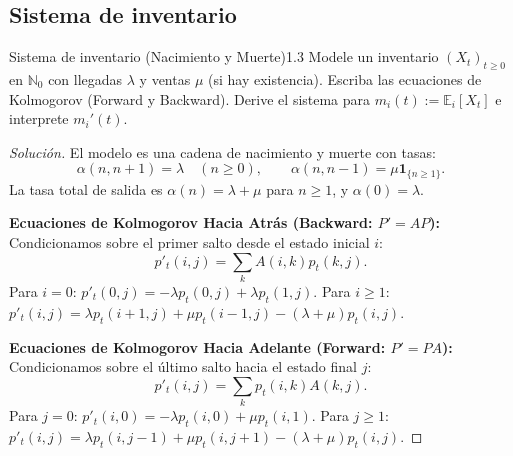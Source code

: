\documentclass[10pt,a4paper]{article}
\begin{document}
\newpage

\subsection{Sistema de inventario}

\begin{ejercicio}{Sistema de inventario (Nacimiento y Muerte)}{1.3}
    Modele un inventario $(X_t)_{t\ge 0}$ en $\mathbb{N}_0$ con llegadas $\lambda$ y ventas $\mu$ (si hay existencia). Escriba las ecuaciones de Kolmogorov (Forward y Backward). Derive el sistema para $m_i(t) := \mathbb{E}_i[X_t]$ e interprete $m_i'(t)$.
\end{ejercicio}


\begin{proof}[Solución]
    El modelo es una cadena de nacimiento y muerte con tasas:
    \[ \alpha(n, n+1) = \lambda \quad (n \ge 0), \qquad \alpha(n, n-1) = \mu \mathbf{1}_{\{n\ge 1\}}. \]
    La tasa total de salida es $\alpha(n) = \lambda + \mu$ para $n \ge 1$, y $\alpha(0) = \lambda$.


    \textbf{Ecuaciones de Kolmogorov Hacia Atrás (Backward: $P' = AP$):}
    Condicionamos sobre el primer salto desde el estado inicial $i$:
    \[ p'_t(i,j) = \sum_{k} A(i,k)p_t(k,j). \]
    Para $i = 0$: $p'_t(0,j) = -\lambda p_t(0,j) + \lambda p_t(1,j)$.
    Para $i \ge 1$: $p'_t(i,j) = \lambda p_t(i+1, j) + \mu p_t(i-1, j) - (\lambda + \mu) p_t(i,j)$.

    \textbf{Ecuaciones de Kolmogorov Hacia Adelante (Forward: $P' = PA$):}
    Condicionamos sobre el último salto hacia el estado final $j$:
    \[ p'_t(i,j) = \sum_{k} p_t(i,k)A(k,j). \]
    Para $j = 0$: $p'_t(i,0) = -\lambda p_t(i,0) + \mu p_t(i,1)$.
    Para $j \ge 1$: $p'_t(i,j) = \lambda p_t(i, j-1) + \mu p_t(i, j+1) - (\lambda + \mu) p_t(i,j)$.


\end{proof}
\end{document}
